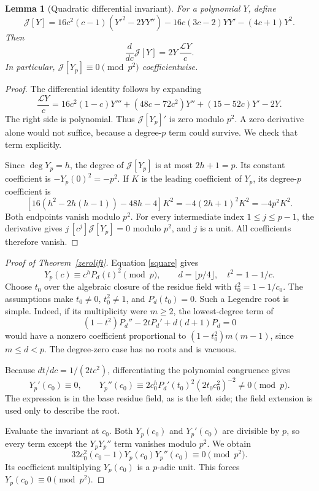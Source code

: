 \documentclass[11pt,a4paper]{article}
\newtheorem{lemma}[theorem]{Lemma}
\theoremstyle{remark}\newtheorem{remark}[theorem]{Remark}
\begin{document}
\begin{lemma}[Quadratic differential invariant]\label{invariant}
For a polynomial \(Y\), define
\[
 \mathcal J[Y]=16c^2(c-1)(Y'^2-2YY'')
              -16c(3c-2)YY'-(4c+1)Y^2.
\]
Then
\[
             \frac{d}{dc}\mathcal J[Y]=2Y\,\frac{\mathcal LY}{c}.
\]
In particular, \(\mathcal J[Y_p]\equiv0\pmod {p^2}\) coefficientwise.
\end{lemma}
\begin{proof}
The differential identity follows by expanding
\[
 \frac{\mathcal LY}{c}
 =16c^2(1-c)Y'''+(48c-72c^2)Y''
                  +(15-52c)Y'-2Y.
\]
The right side is polynomial. Thus \(\mathcal J[Y_p]'\) is zero
modulo \(p^2\). A zero derivative alone would not suffice, because a
degree-\(p\) term could survive. We check that term explicitly.

Since \(\deg Y_p=h\), the degree of \(\mathcal J[Y_p]\) is at most
\(2h+1=p\). Its constant coefficient is \(-Y_p(0)^2=-p^2\).
If \(K\) is the leading coefficient of \(Y_p\), its degree-\(p\)
coefficient is
\[
 [16(h^2-2h(h-1))-48h-4]K^2
                   =-4(2h+1)^2K^2=-4p^2K^2.
\]
Both endpoints vanish modulo \(p^2\). For every intermediate index
\(1\le j\le p-1\), the derivative gives \(j\, [c^j]\mathcal J[Y_p]=0\)
modulo \(p^2\), and \(j\) is a unit. All coefficients therefore vanish.
\end{proof}

\begin{proof}[Proof of Theorem~\ref{zerolift}]
Equation \eqref{square} gives
\[
 Y_p(c)\equiv c^hP_d(t)^2\pmod p,\qquad
 d=\lfloor p/4\rfloor,\quad t^2=1-1/c.
\]
Choose \(t_0\) over the algebraic closure of the residue field with
\(t_0^2=1-1/c_0\).
The assumptions make \(t_0\ne0\), \(t_0^2\ne1\), and \(P_d(t_0)=0\).
Such a Legendre root is simple. Indeed, if its multiplicity were
\(m\ge2\), the lowest-degree term of
\[
        (1-t^2)P_d''-2tP_d'+d(d+1)P_d=0
\]
would have a nonzero coefficient proportional to
\((1-t_0^2)m(m-1)\), since \(m\le d<p\).
The degree-zero case has no roots and is vacuous.

Because \(dt/dc=1/(2tc^2)\), differentiating the polynomial congruence
gives
\[
 Y_p'(c_0)\equiv0,\qquad
 Y_p''(c_0)\equiv
 2c_0^hP_d'(t_0)^2(2t_0c_0^2)^{-2}\ne0\pmod p.
\]
The expression is in the base residue field, as is the left side;
the field extension is used only to describe the root.

Evaluate the invariant at \(c_0\). Both \(Y_p(c_0)\) and
\(Y_p'(c_0)\) are divisible by \(p\), so every term except the
\(Y_pY_p''\) term vanishes modulo \(p^2\). We obtain
\[
       32c_0^2(c_0-1)Y_p(c_0)Y_p''(c_0)\equiv0\pmod {p^2}.
\]
Its coefficient multiplying \(Y_p(c_0)\) is a \(p\)-adic unit.
This forces \(Y_p(c_0)\equiv0\pmod {p^2}\).
\end{proof}
\end{document}
